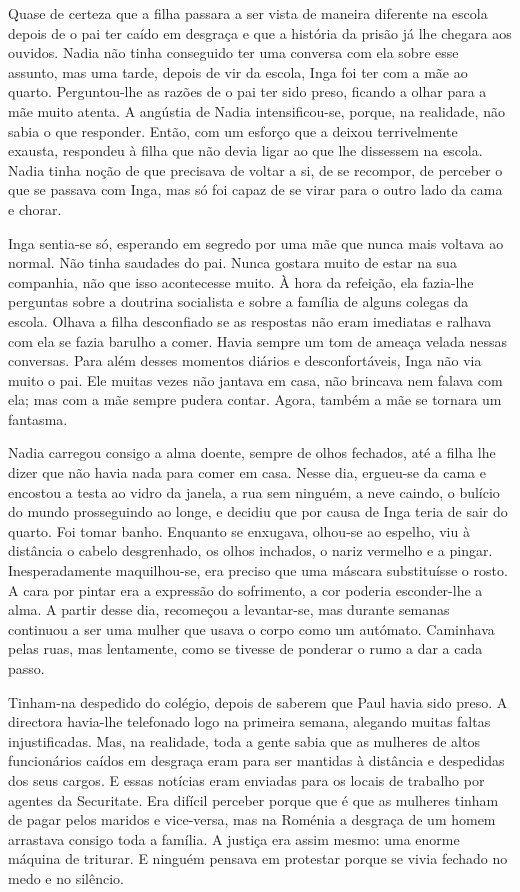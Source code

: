 Quase de certeza que a filha passara a ser vista de maneira diferente na
escola depois de o pai ter caído em desgraça e que a história da prisão
já lhe chegara aos ouvidos. Nadia não tinha conseguido ter uma conversa
com ela sobre esse assunto, mas uma tarde, depois de vir da escola, Inga
foi ter com a mãe ao quarto. Perguntou-lhe as razões de o pai ter sido
preso, ficando a olhar para a mãe muito atenta. A angústia de Nadia
intensificou-se, porque, na realidade, não sabia o que responder. Então,
com um esforço que a deixou terrivelmente exausta, respondeu à filha
que não devia ligar ao que lhe dissessem na escola. Nadia tinha noção de
que precisava de voltar a si, de se recompor, de perceber o que se
passava com Inga, mas só foi capaz de se virar para o outro lado da cama
e chorar.

Inga sentia-se só, esperando em segredo por uma mãe
que nunca mais voltava ao normal. Não tinha saudades do pai. Nunca
gostara muito de estar na sua companhia, não que isso acontecesse muito.
À hora da refeição, ela fazia-lhe perguntas sobre a doutrina socialista e sobre a família de alguns
colegas da escola. Olhava a filha desconfiado se as respostas não eram
imediatas e ralhava com ela se fazia barulho a comer. Havia sempre um
tom de ameaça velada nessas conversas. Para além desses momentos diários
e desconfortáveis, Inga não via muito o pai. Ele muitas vezes não
jantava em casa, não brincava nem falava com ela; mas com a mãe sempre
pudera contar. Agora, também a mãe se tornara um fantasma.

Nadia carregou consigo a alma doente, sempre de olhos fechados, até a
filha lhe dizer que não havia nada para comer em casa. Nesse dia,
ergueu-se da cama e encostou a testa ao vidro da janela, a rua sem
ninguém, a neve caindo, o bulício do mundo prosseguindo ao longe, e
decidiu que por causa de Inga teria de sair do quarto. Foi tomar banho.
Enquanto se enxugava, olhou-se ao espelho, viu à distância o cabelo
desgrenhado, os olhos inchados, o nariz vermelho e a pingar.
Inesperadamente maquilhou-se, era preciso que uma máscara substituísse o rosto. A cara por pintar
era a expressão do sofrimento, a cor poderia esconder-lhe a alma. A
partir desse dia, recomeçou a levantar-se, mas durante semanas continuou
a ser uma mulher que usava o corpo como um autómato. Caminhava pelas
ruas, mas lentamente, como se tivesse de ponderar o rumo a dar a cada
passo.

Tinham-na despedido do colégio, depois de saberem que Paul havia sido
preso. A directora havia-lhe telefonado logo na primeira semana,
alegando muitas faltas injustificadas. Mas, na realidade, toda a gente
sabia que as mulheres de altos funcionários caídos em desgraça eram para ser mantidas à
distância e despedidas dos seus cargos. E essas notícias eram enviadas
para os locais de trabalho por agentes da Securitate. Era difícil
perceber porque que é que as mulheres tinham de pagar pelos maridos e
vice-versa, mas na Roménia a desgraça de um homem arrastava consigo
toda a família. A justiça era assim mesmo: uma enorme máquina de
triturar. E ninguém pensava em protestar porque se vivia fechado no
medo e no silêncio.

